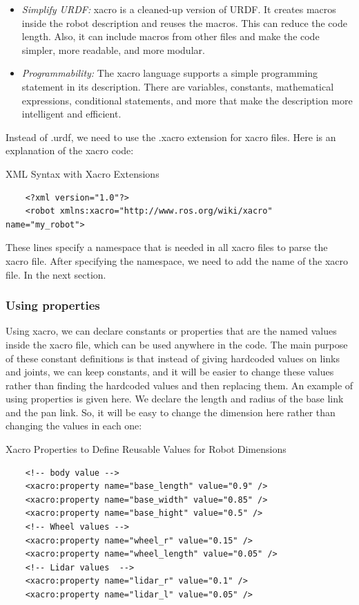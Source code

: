\documentclass[../../main]{subfiles}
\begin{document}
\begin{itemize}
    \item \emph{Simplify URDF:} xacro is a cleaned-up version of URDF. It creates macros inside the robot description and reuses the macros. This can reduce the code length. Also, it can include macros from other files and make the code simpler, more readable, and more modular.
    \item \emph{Programmability:} The xacro language supports a simple programming statement in its description. There are variables, constants, mathematical expressions, conditional statements, and more that make the description more intelligent and efficient.
\end{itemize}

Instead of .urdf, we need to use the .xacro extension for xacro files.
Here is an explanation of the xacro code:
\begin{codebox}[]{XML Syntax with Xacro Extensions}
  \begin{verbatim}
    <?xml version="1.0"?>
    <robot xmlns:xacro="http://www.ros.org/wiki/xacro" name="my_robot">
\end{verbatim}
  \end{codebox}
These lines specify a namespace that is needed in all xacro files to parse the xacro file.
After specifying the namespace, we need to add the name of the xacro file. In the next section.

\subsubsection{Using properties}
Using xacro, we can declare constants or properties that are the named values inside the
xacro file, which can be used anywhere in the code. The main purpose of these constant
definitions is that instead of giving hardcoded values on links and joints, we can keep
constants, and it will be easier to change these values rather than finding the hardcoded
values and then replacing them.
An example of using properties is given here. We declare the length and radius of the
base link and the pan link. So, it will be easy to change the dimension here rather than
changing the values in each one:
\begin{codebox}[]{Xacro Properties to Define Reusable Values for Robot Dimensions}
  \begin{verbatim}
    <!-- body value -->
    <xacro:property name="base_length" value="0.9" />
    <xacro:property name="base_width" value="0.85" />
    <xacro:property name="base_hight" value="0.5" />
    <!-- Wheel values -->
    <xacro:property name="wheel_r" value="0.15" />
    <xacro:property name="wheel_length" value="0.05" />
    <!-- Lidar values  -->
    <xacro:property name="lidar_r" value="0.1" />
    <xacro:property name="lidar_l" value="0.05" />
\end{verbatim}
\end{codebox}
\end{document}
